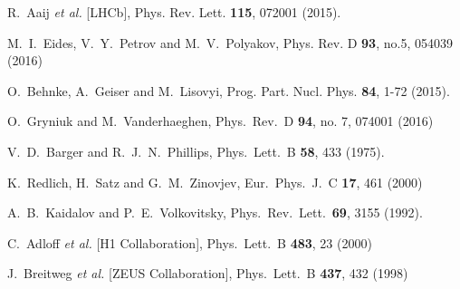 \documentclass[10pt,prd,aps,nofootinbib,superscriptaddress]{revtex4}
\begin{document}
\begin{thebibliography}{99}
R.~Aaij \textit{et al.} [LHCb],
Phys. Rev. Lett. \textbf{115}, 072001 (2015). 

M.~I.~Eides, V.~Y.~Petrov and M.~V.~Polyakov,
Phys. Rev. D \textbf{93}, no.5, 054039 (2016)

O.~Behnke, A.~Geiser and M.~Lisovyi,
Prog. Part. Nucl. Phys. \textbf{84}, 1-72 (2015).



  O.~Gryniuk and M.~Vanderhaeghen,
  Phys.\ Rev.\ D {\bf 94}, no. 7, 074001 (2016)

  V.~D.~Barger and R.~J.~N.~Phillips,
  Phys.\ Lett.\ B {\bf 58}, 433 (1975).
  

  K.~Redlich, H.~Satz and G.~M.~Zinovjev,
  Eur.\ Phys.\ J.\ C {\bf 17}, 461 (2000)

  A.~B.~Kaidalov and P.~E.~Volkovitsky,
  Phys.\ Rev.\ Lett.\  {\bf 69}, 3155 (1992).
 
 
  C.~Adloff {\it et al.} [H1 Collaboration],
  Phys.\ Lett.\ B {\bf 483}, 23 (2000)


  J.~Breitweg {\it et al.} [ZEUS Collaboration],
  Phys.\ Lett.\ B {\bf 437}, 432 (1998)
 


\end{thebibliography}
\end{document}
